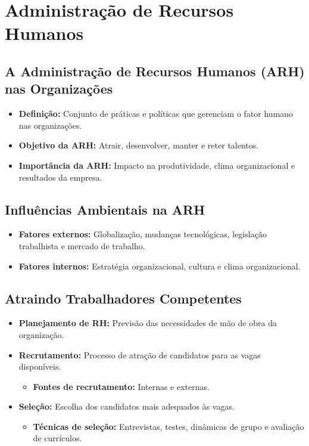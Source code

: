 \documentclass{article}
\begin{document}
\section{Administração de Recursos Humanos}

\subsection{A Administração de Recursos Humanos (ARH) nas Organizações}
\begin{itemize}
    \item \textbf{Definição:} Conjunto de práticas e políticas que gerenciam o fator humano nas organizações. 
    \item \textbf{Objetivo da ARH:} Atrair, desenvolver, manter e reter talentos. 
    \item \textbf{Importância da ARH:} Impacto na produtividade, clima organizacional e resultados da empresa. 
\end{itemize}

\subsection{Influências Ambientais na ARH}
\begin{itemize}
    \item \textbf{Fatores externos:} Globalização, mudanças tecnológicas, legislação trabalhista e mercado de trabalho. 
    \item \textbf{Fatores internos:} Estratégia organizacional, cultura e clima organizacional. 
\end{itemize}

\subsection{Atraindo Trabalhadores Competentes}
\begin{itemize}
    \item \textbf{Planejamento de RH:} Previsão das necessidades de mão de obra da organização. 
    \item \textbf{Recrutamento:} Processo de atração de candidatos para as vagas disponíveis. 
    \begin{itemize}
        \item \textbf{Fontes de recrutamento:} Internas e externas. 
    \end{itemize}
    \item \textbf{Seleção:} Escolha dos candidatos mais adequados às vagas. 
    \begin{itemize}
        \item \textbf{Técnicas de seleção:} Entrevistas, testes, dinâmicas de grupo e avaliação de currículos. 
    \end{itemize}
\end{itemize}
\end{document}
